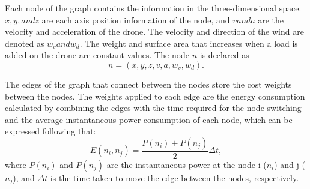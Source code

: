 \documentclass[journal]{./template/IEEEtran}
\begin{document}

Each node of the graph contains the information in the three-dimensional space. $x,y, and z$ are each axis position information of the node, and $v and a$ are the velocity and acceleration of the drone. 
The velocity and direction of the wind are denoted as $w_v and w_d$. The weight and surface area that increases when a load is added on the drone are constant values.
The node $n$ is declared as 
\begin{equation*}
n = (x, y, z, v, a, w_v, w_d).
\end{equation*}

The edges of the graph that connect between the nodes store the cost weights between the nodes.
The weights applied to each edge are the energy consumption calculated by combining the edges with the time required for the node switching and the average instantaneous power consumption of each node, which can be expressed following that: 
\begin{equation*}
E(n_i, n_j) = \frac{P(n_i)+P(n_j)}{2} \Delta t,
\end{equation*}
where $P(n_i)$ and $P(n_j)$ are the instantaneous power at the node i ($n_i$) and j ($n_j$), and $\Delta t$ is the time taken to move the edge between the nodes, respectively.
\end{document}

